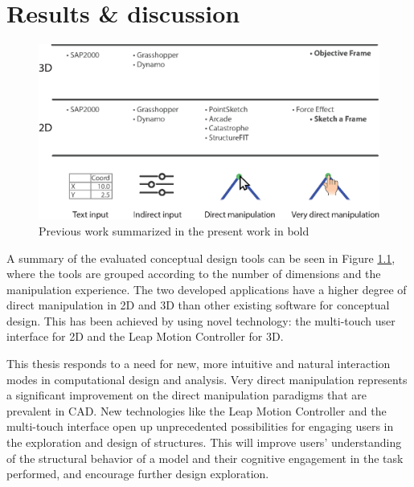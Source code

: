 \chapter{Results \& discussion}
\label{ch:Results discussion}
\begin{figure}
  \includegraphics[width=330pt]{graphics/softwareReview.eps}
  \caption{Previous work summarized in the present work in bold}
  \label{fig:softwareReview}
\end{figure}

A summary of the evaluated conceptual design tools can be seen in Figure \ref{fig:softwareReview}, where the tools are grouped according to the number of dimensions and the manipulation experience. The two developed applications have a higher degree of direct manipulation in 2D and 3D than other existing software for conceptual design. This has been achieved by using novel technology: the multi-touch user interface for 2D and the Leap Motion Controller for 3D.

This thesis responds to a need for new, more intuitive and natural interaction modes in computational design and analysis. Very direct manipulation represents a significant improvement on the direct manipulation paradigms that are prevalent in CAD. New technologies like the Leap Motion Controller and the multi-touch interface open up unprecedented possibilities for engaging users in the exploration and design of structures. This will improve users’ understanding of the structural behavior of a model and their cognitive engagement in the task performed, and encourage further design exploration.


